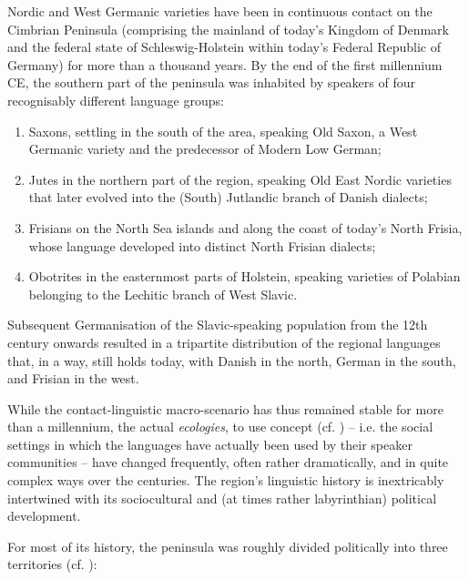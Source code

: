 \documentclass[output=paper]{langsci/langscibook}
\begin{document}
Nordic and West Germanic varieties have been in continuous contact on the Cimbrian Peninsula (comprising the mainland of today’s Kingdom of Denmark and the federal state of Schleswig-Holstein within today’s Federal Republic of Germany) for more than a thousand years. By the end of the first millennium CE, the southern part of the peninsula was inhabited by speakers of four recognisably different language groups:

\begin{enumerate}
	\item Saxons, settling in the south of the area, speaking Old Saxon, a West Germanic variety and the predecessor of Modern Low German;
	\item Jutes in the northern part of the region, speaking Old East Nordic varieties that later evolved into the (South) Jutlandic branch of Danish dialects;
	\item Frisians on the North Sea islands and along the coast of today’s North Frisia, whose language developed into distinct North Frisian dialects;
	\item Obotrites in the easternmost parts of Holstein, speaking varieties of Polabian belonging to the Lechitic branch of West Slavic.
\end{enumerate}

Subsequent Germanisation of the Slavic-speaking population from the 12th century onwards resulted in a tripartite distribution of the regional languages that, in a way, still holds today, with Danish in the north, German in the south, and Frisian in the west.

While the contact-linguistic macro-scenario has thus remained stable for more than a millennium, the actual \textit{ecologies}, to use  concept (cf. \citealt{Eliasson.2013}) – i.e. the social settings in which the languages have actually been used by their speaker communities – have changed frequently, often rather dramatically, and in quite complex ways over the centuries. The region’s linguistic history is inextricably intertwined with its sociocultural and (at times rather labyrinthian) political development.

For most of its history, the peninsula was roughly divided politically into three territories (cf. ):
\end{document}
